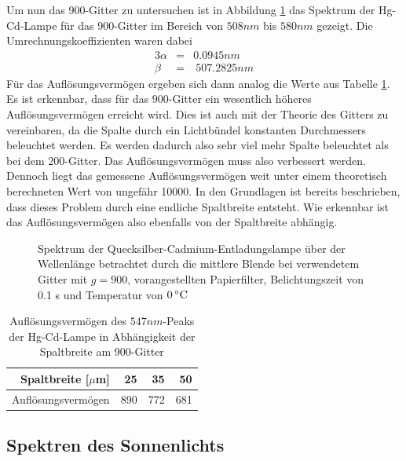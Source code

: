 		Um nun das 900-Gitter zu untersuchen ist in Abbildung \ref{hg-900-scale} das Spektrum der Hg-Cd-Lampe für das 900-Gitter im Bereich von $508\unit{nm}$ bis $580\unit{nm}$ gezeigt.
		Die Umrechnungskoeffizienten waren dabei
		\begin{alignat*}{3}
			\alpha &=& 0.0945\unit{nm} \\
			\beta &=& \ 507.2825\unit{nm}
		\end{alignat*}
		Für das Auflösungsvermögen ergeben sich dann analog die Werte aus Tabelle \ref{tab:900-gitter-aufloesung}.
		Es ist erkennbar, dass für das 900-Gitter ein wesentlich höheres Auflösungsvermögen erreicht wird.
		Dies ist auch mit der Theorie des Gitters zu vereinbaren, da die Spalte durch ein Lichtbündel konstanten Durchmessers beleuchtet werden.
		Es werden dadurch also sehr viel mehr Spalte beleuchtet als bei dem 200-Gitter.
		Das Auflösungsvermögen muss also verbessert werden.
		Dennoch liegt das gemessene Auflösungsvermögen weit unter einem theoretisch berechneten  Wert von ungefähr 10000.
		In den Grundlagen ist bereits beschrieben, dass dieses Problem durch eine endliche Spaltbreite entsteht.
		Wie erkennbar ist das Auflösungsvermögen also ebenfalls von der Spaltbreite abhängig. 

		\begin{figure}
			\center
			
			\caption{Spektrum der Quecksilber-Cadmium-Entladungslampe über der Wellenlänge betrachtet durch die mittlere Blende bei verwendetem Gitter mit $g=900$, vorangestellten Papierfilter, Belichtungszeit von 0.1 s und Temperatur von $0\, \text{$^\circ$C}$}
			\label{hg-900-scale}
		\end{figure}

		\begin{table}
			\center
			\caption{Auflösungsvermögen des $547\unit{nm}$-Peaks der Hg-Cd-Lampe in Abhängigkeit der Spaltbreite am 900-Gitter}
			\label{tab:900-gitter-aufloesung}
			\begin{tabular}{r|r|r|r}
				Spaltbreite [$\mu$m] & 25 & 35 & 50 \\
				\hline
				Auflösungsvermögen & 890 & 772 & 681
			\end{tabular}
		\end{table}


	\subsection{Spektren des Sonnenlichts} %
	\label{sub:spektren_des_sonnenlichts}

